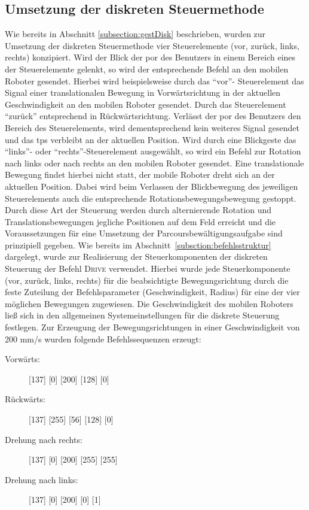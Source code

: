 \subsection{Umsetzung der diskreten Steuermethode}
\label{subsection:diskSt}
Wie bereits in Abschnitt \ref{subsection:gestDisk} beschrieben, wurden zur Umsetzung der diskreten Steuermethode vier Steuerelemente (vor, zurück, links, rechts) konzipiert.
Wird der Blick \bzw der \acs{por} des Benutzers in einem Bereich eines der Steuerelemente gelenkt, so wird der entsprechende Befehl an den mobilen Roboter gesendet. Hierbei wird beispielsweise durch das \enquote{vor}- Steuerelement das Signal einer translationalen Bewegung in Vorwärtsrichtung in der aktuellen Geschwindigkeit an den mobilen Roboter gesendet. Durch das Steuerelement \enquote{zurück} entsprechend in Rückwärtsrichtung. Verlässt der \acs{por} des Benutzers den Bereich des Steuerelements, wird dementsprechend kein weiteres Signal gesendet und das \acs{tps} verbleibt an der aktuellen Position. Wird durch eine Blickgeste das \enquote{links}- oder \enquote{rechts}-Steuerelement ausgewählt, so wird ein Befehl zur Rotation nach links oder nach rechts an den mobilen Roboter gesendet. Eine translationale Bewegung findet hierbei nicht statt, der mobile Roboter dreht sich an der aktuellen Position. Dabei wird beim Verlassen der Blickbewegung des jeweiligen Steuerelements auch die entsprechende Rotationsbewegungsbewegung gestoppt. Durch diese Art der Steuerung werden durch alternierende Rotation und Translationsbewegungen jegliche Positionen auf dem Feld erreicht und die Voraussetzungen für eine Umsetzung der Parcoursbewältigungsaufgabe sind prinzipiell gegeben. Wie bereits im Abschnitt~\ref{subsction:befehlsstruktur} dargelegt, wurde zur Realisierung der Steuerkomponenten der diskreten Steuerung der Befehl \textsc{Drive} verwendet. Hierbei wurde jede Steuerkomponente (vor, zurück, links, rechts) für die beabsichtigte Bewegungsrichtung durch die feste Zuteilung der Befehlsparameter (Geschwindigkeit, Radius) für eine der vier möglichen Bewegungen zugewiesen. Die Geschwindigkeit des mobilen Roboters ließ sich in den allgemeinen Systemeinstellungen für die diskrete Steuerung festlegen. Zur Erzeugung der Bewegungsrichtungen in einer Geschwindigkeit von 200 mm/s wurden folgende Befehlssequenzen erzeugt: 
\begin{description}
\item [Vorwärts:] [137] [0] [200] [128] [0]
\item [Rückwärts:] [137] [255] [56] [128] [0]
\item [Drehung nach rechts:] [137] [0] [200] [255] [255]
\item [Drehung nach links:] [137] [0] [200] [0] [1]
\end{description}

